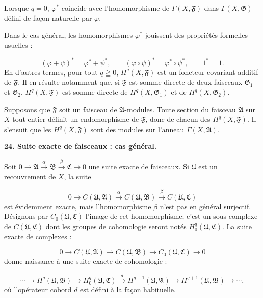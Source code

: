 Lorsque $q = 0$, $\varphi^*$ coincide avec l'homomorphisme de $\Gamma(X, \mathfrak{F})$ dans $\Gamma(X, \mathfrak{G})$ défini de façon naturelle par $\varphi$.

Dans le cas général, les homomorphismes $\varphi^*$ jouissent des propriétés formelles usuelles :

\begin{equation*}
(\varphi + \psi)^* = \varphi^* + \psi^*, \qquad (\varphi \circ \psi)^* = \varphi^* \circ \psi^*, \qquad 1^* = 1.
\end{equation*}
En d'autres termes, pour tout $q \geqq 0$, $H^q(X, \mathfrak{F})$ est un foncteur covariant additif de $\mathfrak{F}$. Il en résulte notamment que, si $\mathfrak{F}$ est somme directe de deux faisceaux $\mathfrak{G}_1$ et $\mathfrak{G}_2$, $H^q(X, \mathfrak{F})$ est somme directe de $H^q(X, \mathfrak{G}_1)$ et de $H^q(X, \mathfrak{G}_2)$.

Supposons que $\mathfrak{F}$ soit un faisceau de $\mathfrak{A}$-modules. Toute section du faisceau $\mathfrak{A}$ sur $X$ tout entier définit un endomorphisme de $\mathfrak{F}$, donc de chacun des $H^q(X, \mathfrak{F})$. Il s'ensuit que les $H^q(X, \mathfrak{F})$ sont des modules sur l'anneau $\Gamma(X, \mathfrak{A})$.


\textbf{24. Suite exacte de faisceaux : cas général.}

Soit $0 \to \mathfrak{A} \xrightarrow{\alpha} \mathfrak{B} \xrightarrow{\beta} \mathfrak{C} \to 0$ une suite exacte de faisceaux. Si $\mathfrak{U}$ est un recouvrement de $X$, la suite

\begin{equation*}
0 \to C(\mathfrak{U}, \mathfrak{A}) \xrightarrow{\alpha} C(\mathfrak{U}, \mathfrak{B}) \xrightarrow{\beta} C(\mathfrak{U}, \mathfrak{C})
\end{equation*}
est évidemment exacte, mais l'homomorphisme $\beta$ n'est pas en général surjectif. Désignons par $C_0(\mathfrak{U}, \mathfrak{C})$ l'image de cet homomorphisme; c'est un sous-complexe de $C(\mathfrak{U}, \mathfrak{C})$ dont les groupes de cohomologie seront notés $H_0^q(\mathfrak{U}, \mathfrak{C})$. La suite exacte de complexes :

\begin{equation*}
0 \to C(\mathfrak{U}, \mathfrak{A}) \to C(\mathfrak{U}, \mathfrak{B}) \to C_0(\mathfrak{U}, \mathfrak{C}) \to 0
\end{equation*}
donne naissance à une suite exacte de cohomologie :

\begin{equation*}
\cdots \to H^q(\mathfrak{U}, \mathfrak{B}) \to H_0^q(\mathfrak{U}, \mathfrak{C}) \xrightarrow{d} H^{q+1}(\mathfrak{U}, \mathfrak{A}) \to H^{q+1}(\mathfrak{U}, \mathfrak{B}) \to \cdots ,
\end{equation*}
où l'opérateur cobord $d$ est défini à la façon habituelle.

